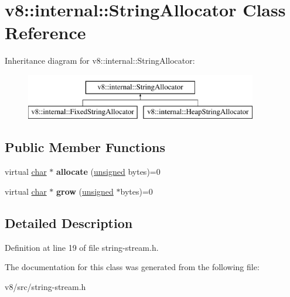 \hypertarget{classv8_1_1internal_1_1StringAllocator}{}\section{v8\+:\+:internal\+:\+:String\+Allocator Class Reference}
\label{classv8_1_1internal_1_1StringAllocator}
Inheritance diagram for v8\+:\+:internal\+:\+:String\+Allocator\+:\begin{figure}[H]
\begin{center}
\leavevmode
\includegraphics[height=2.000000cm]{classv8_1_1internal_1_1StringAllocator}
\end{center}
\end{figure}
\subsection*{Public Member Functions}
\begin{DoxyCompactItemize}
\item 
\mbox{\label{classv8_1_1internal_1_1StringAllocator_a3e2a67fc8455cf91240490208789967d}} 
virtual \mbox{\hyperlink{classchar}{char}} $\ast$ {\bfseries allocate} (\mbox{\hyperlink{classunsigned}{unsigned}} bytes)=0
\item 
\mbox{\label{classv8_1_1internal_1_1StringAllocator_ac27c6a95c5a5e07d202f44f2d71febec}} 
virtual \mbox{\hyperlink{classchar}{char}} $\ast$ {\bfseries grow} (\mbox{\hyperlink{classunsigned}{unsigned}} $\ast$bytes)=0
\end{DoxyCompactItemize}


\subsection{Detailed Description}


Definition at line 19 of file string-\/stream.\+h.



The documentation for this class was generated from the following file\+:\begin{DoxyCompactItemize}
\item 
v8/src/string-\/stream.\+h\end{DoxyCompactItemize}
